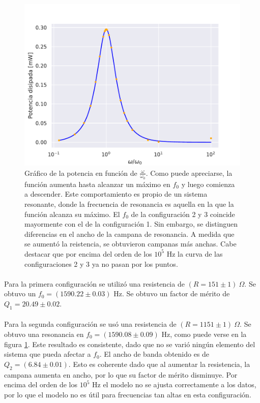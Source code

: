 \begin{figure} [H]
    \includegraphics[scale=0.5]{figuras/RLC-SERIE-3/potencia.pdf}
    \caption{Gráfico de la potencia en función de $\frac{\omega}{\omega_0}$. Como puede apreciarse, la función aumenta hasta alcanzar un máximo en $f_0$ y luego comienza a descender. Este comportamiento es propio de un sistema resonante, donde la frecuencia de resonancia es aquella en la que la función alcanza su máximo. El $f_0$ de la configuración 2 y 3 coincide mayormente con el de la configuración 1. Sin embargo, se distinguen diferencias en el ancho de la campana de resonancia. A medida que se aumentó la reistencia, se obtuvieron campanas más anchas. Cabe destacar que por encima del orden de los $10^5$ Hz la curva de las configuraciones 2 y 3 ya no pasan por los puntos.}
    \label{fig:potencia_serie}
\end{figure}

\paragraph{} Para la primera configuración se utilizó una resistencia de $(R=151 \pm 1)\ \Omega$. 
Se obtuvo un $f_0 = (1590.22 \pm 0.03)$ Hz. Se obtuvo un factor de mérito de  $Q_1= 20.49 \pm 0.02$.

\paragraph{} Para la segunda configuración se usó una resistencia de $(R= 1151 \pm 1)\ \Omega$. Se obtuvo una resonancia en $f_0 = (1590.08 \pm 0.09)$ Hz, como puede verse en la figura \ref{fig:potencia_serie}. Este resultado es consistente, dado que no se varió ningún elemento del sistema que pueda afectar a $f_0$. El ancho de banda obtenido es de $Q_2 = (6.84 \pm 0.01)$. Esto es coherente dado que al aumentar la resistencia, la campana aumenta en ancho, por lo que su factor de mérito disminuye. Por encima del orden de los $10^5$ Hz el modelo no se ajusta correctamente a los datos, por lo que el modelo no es útil para frecuencias tan altas en esta configuración. 

